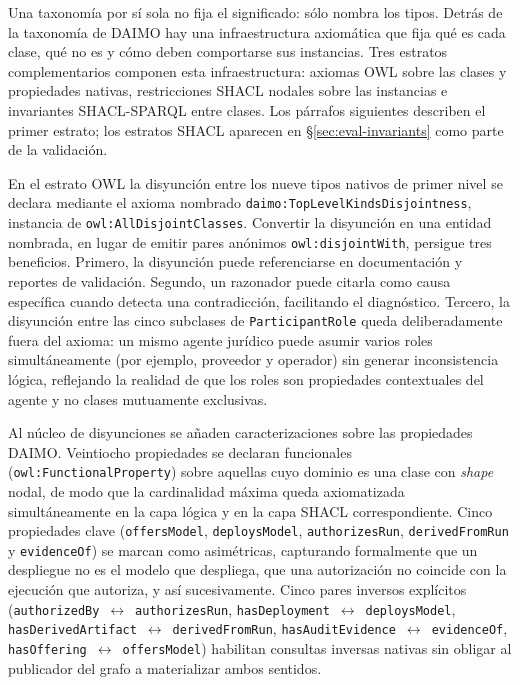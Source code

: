 \documentclass[Afour,sagev,times]{sagej}
\newcommand{\code}[1]{\texttt{#1}}
\begin{document}
Una taxonomía por sí sola no fija el significado: sólo nombra los tipos. Detrás de la taxonomía de DAIMO hay una infraestructura axiomática que fija qué es cada clase, qué no es y cómo deben comportarse sus instancias. Tres estratos complementarios componen esta infraestructura: axiomas OWL sobre las clases y propiedades nativas, restricciones SHACL nodales sobre las instancias e invariantes SHACL-SPARQL entre clases. Los párrafos siguientes describen el primer estrato; los estratos SHACL aparecen en §\ref{sec:eval-invariants} como parte de la validación.

En el estrato OWL la disyunción entre los nueve tipos nativos de primer nivel se declara mediante el axioma nombrado \code{daimo:TopLevelKindsDisjointness}, instancia de \code{owl:AllDisjointClasses}. Convertir la disyunción en una entidad nombrada, en lugar de emitir pares anónimos \code{owl:disjointWith}, persigue tres beneficios. Primero, la disyunción puede referenciarse en documentación y reportes de validación. Segundo, un razonador puede citarla como causa específica cuando detecta una contradicción, facilitando el diagnóstico. Tercero, la disyunción entre las cinco subclases de \code{ParticipantRole} queda deliberadamente fuera del axioma: un mismo agente jurídico puede asumir varios roles simultáneamente (por ejemplo, proveedor y operador) sin generar inconsistencia lógica, reflejando la realidad de que los roles son propiedades contextuales del agente y no clases mutuamente exclusivas.

Al núcleo de disyunciones se añaden caracterizaciones sobre las propiedades DAIMO. Veintiocho propiedades se declaran funcionales (\code{owl:FunctionalProperty}) sobre aquellas cuyo dominio es una clase con \emph{shape} nodal, de modo que la cardinalidad máxima queda axiomatizada simultáneamente en la capa lógica y en la capa SHACL correspondiente. Cinco propiedades clave (\code{offersModel}, \code{deploysModel}, \code{authorizesRun}, \code{derivedFromRun} y \code{evidenceOf}) se marcan como asimétricas, capturando formalmente que un despliegue no es el modelo que despliega, que una autorización no coincide con la ejecución que autoriza, y así sucesivamente. Cinco pares inversos explícitos (\code{authorizedBy}~$\leftrightarrow$~\code{authorizesRun}, \code{hasDeployment}~$\leftrightarrow$~\code{deploysModel}, \code{hasDerivedArtifact}~$\leftrightarrow$~\code{derivedFromRun}, \code{hasAuditEvidence}~$\leftrightarrow$~\code{evidenceOf}, \code{hasOffering}~$\leftrightarrow$~\code{offersModel}) habilitan consultas inversas nativas sin obligar al publicador del grafo a materializar ambos sentidos.
\end{document}

